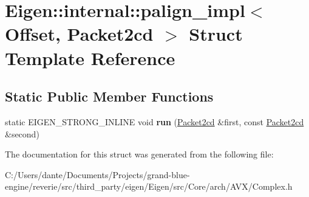 \hypertarget{struct_eigen_1_1internal_1_1palign__impl_3_01_offset_00_01_packet2cd_01_4}{}\section{Eigen\+::internal\+::palign\+\_\+impl$<$ Offset, Packet2cd $>$ Struct Template Reference}
\label{struct_eigen_1_1internal_1_1palign__impl_3_01_offset_00_01_packet2cd_01_4}
\subsection*{Static Public Member Functions}
\begin{DoxyCompactItemize}
\item 
\mbox{\label{struct_eigen_1_1internal_1_1palign__impl_3_01_offset_00_01_packet2cd_01_4_a591e59857a9546b969896c00726c2312}} 
static E\+I\+G\+E\+N\+\_\+\+S\+T\+R\+O\+N\+G\+\_\+\+I\+N\+L\+I\+NE void {\bfseries run} (\mbox{\hyperlink{struct_eigen_1_1internal_1_1_packet2cd}{Packet2cd}} \&first, const \mbox{\hyperlink{struct_eigen_1_1internal_1_1_packet2cd}{Packet2cd}} \&second)
\end{DoxyCompactItemize}


The documentation for this struct was generated from the following file\+:\begin{DoxyCompactItemize}
\item 
C\+:/\+Users/dante/\+Documents/\+Projects/grand-\/blue-\/engine/reverie/src/third\+\_\+party/eigen/\+Eigen/src/\+Core/arch/\+A\+V\+X/Complex.\+h\end{DoxyCompactItemize}
